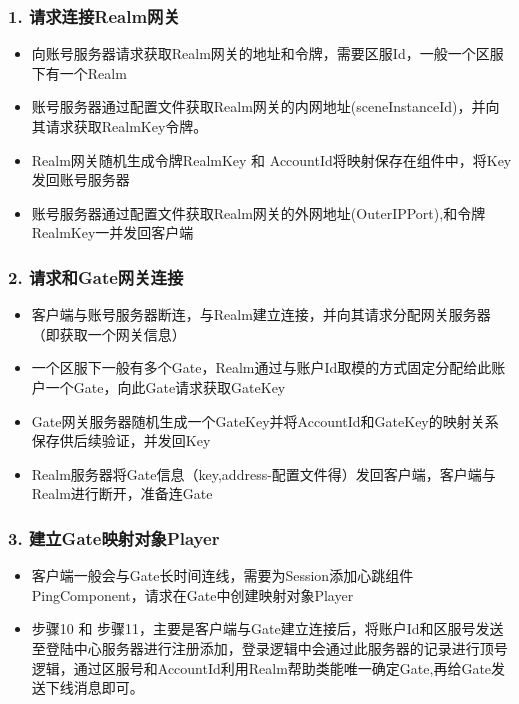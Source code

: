 \documentclass[9pt, b5paper]{article}
\begin{document}
\subsubsection{1. 请求连接Realm网关}
\label{sec-3-2-1}
\begin{itemize}
\item 向账号服务器请求获取Realm网关的地址和令牌，需要区服Id，一般一个区服下有一个Realm
\item 账号服务器通过配置文件获取Realm网关的内网地址(sceneInstanceId)，并向其请求获取RealmKey令牌。
\item Realm网关随机生成令牌RealmKey 和 AccountId将映射保存在组件中，将Key发回账号服务器
\item 账号服务器通过配置文件获取Realm网关的外网地址(OuterIPPort),和令牌RealmKey一并发回客户端
\end{itemize}
\subsubsection{2. 请求和Gate网关连接}
\label{sec-3-2-2}
\begin{itemize}
\item 客户端与账号服务器断连，与Realm建立连接，并向其请求分配网关服务器（即获取一个网关信息）
\item 一个区服下一般有多个Gate，Realm通过与账户Id取模的方式固定分配给此账户一个Gate，向此Gate请求获取GateKey
\item Gate网关服务器随机生成一个GateKey并将AccountId和GateKey的映射关系保存供后续验证，并发回Key
\item Realm服务器将Gate信息（key,address-配置文件得）发回客户端，客户端与Realm进行断开，准备连Gate
\end{itemize}
\subsubsection{3. 建立Gate映射对象Player}
\label{sec-3-2-3}
\begin{itemize}
\item 客户端一般会与Gate长时间连线，需要为Session添加心跳组件PingComponent，请求在Gate中创建映射对象Player
\item 步骤10 和 步骤11，主要是客户端与Gate建立连接后，将账户Id和区服号发送至登陆中心服务器进行注册添加，登录逻辑中会通过此服务器的记录进行顶号逻辑，通过区服号和AccountId利用Realm帮助类能唯一确定Gate,再给Gate发送下线消息即可。
\end{itemize}
\end{document}
